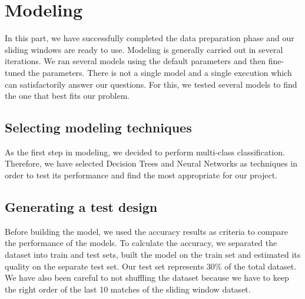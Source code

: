 
\chapter{Modeling}
\label{cha:Modeling}

In this part, we have successfully completed the data preparation phase and our sliding windows are ready to use. \newline \newline
Modeling is generally carried out in several iterations. We ran several models using the default parameters and then fine-tuned the parameters. There is not a single model and a single execution which can satisfactorily answer our questions. For this, we tested several models to find the one that best fits our problem.


\section{Selecting modeling techniques}

As the first step in modeling, we decided to perform multi-class classification.\newline
Therefore, we have selected Decision Trees and Neural Networks as techniques in order to test its performance and find the most appropriate for our project.

\section{Generating a test design}

Before building the model, we used the accuracy results as criteria to compare the performance of the models.\newline \newline
To calculate the accuracy, we separated the dataset into train and test sets, built the model on the train set and estimated its quality on the separate test set. Our test set represents 30\% of the total dataset.\newline \newline
We have also been careful to not shuffling the dataset because we have to keep the right order of the last 10 matches of the sliding window dataset.

